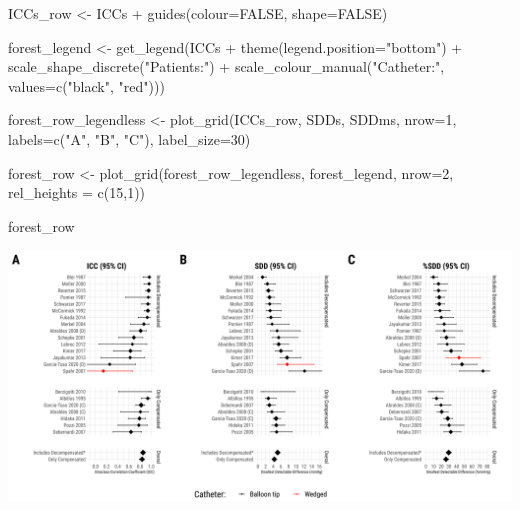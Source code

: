 \documentclass[
]{article}
\newenvironment{Shaded}{\begin{snugshade}}{\end{snugshade}}
\newcommand{\AttributeTok}[1]{\textcolor[rgb]{0.77,0.63,0.00}{#1}}
\newcommand{\ConstantTok}[1]{\textcolor[rgb]{0.00,0.00,0.00}{#1}}
\newcommand{\DecValTok}[1]{\textcolor[rgb]{0.00,0.00,0.81}{#1}}
\newcommand{\FunctionTok}[1]{\textcolor[rgb]{0.00,0.00,0.00}{#1}}
\newcommand{\NormalTok}[1]{#1}
\newcommand{\OtherTok}[1]{\textcolor[rgb]{0.56,0.35,0.01}{#1}}
\newcommand{\SpecialCharTok}[1]{\textcolor[rgb]{0.00,0.00,0.00}{#1}}
\newcommand{\StringTok}[1]{\textcolor[rgb]{0.31,0.60,0.02}{#1}}
\begin{document}
\begin{Shaded}
\begin{Highlighting}[]
\NormalTok{ICCs\_row }\OtherTok{\textless{}{-}}\NormalTok{ ICCs }\SpecialCharTok{+} \FunctionTok{guides}\NormalTok{(}\AttributeTok{colour=}\ConstantTok{FALSE}\NormalTok{, }\AttributeTok{shape=}\ConstantTok{FALSE}\NormalTok{)}

\NormalTok{forest\_legend }\OtherTok{\textless{}{-}} \FunctionTok{get\_legend}\NormalTok{(ICCs }\SpecialCharTok{+} 
                              \FunctionTok{theme}\NormalTok{(}\AttributeTok{legend.position=}\StringTok{"bottom"}\NormalTok{) }\SpecialCharTok{+}
                              \FunctionTok{scale\_shape\_discrete}\NormalTok{(}\StringTok{"Patients:"}\NormalTok{) }\SpecialCharTok{+}
                              \FunctionTok{scale\_colour\_manual}\NormalTok{(}\StringTok{"Catheter:"}\NormalTok{,}
                                \AttributeTok{values=}\FunctionTok{c}\NormalTok{(}\StringTok{"black"}\NormalTok{, }\StringTok{"red"}\NormalTok{)))}

\NormalTok{forest\_row\_legendless }\OtherTok{\textless{}{-}} \FunctionTok{plot\_grid}\NormalTok{(ICCs\_row, SDDs, SDDms,}
          \AttributeTok{nrow=}\DecValTok{1}\NormalTok{, }\AttributeTok{labels=}\FunctionTok{c}\NormalTok{(}\StringTok{"A"}\NormalTok{, }\StringTok{"B"}\NormalTok{, }\StringTok{"C"}\NormalTok{), }
          \AttributeTok{label\_size=}\DecValTok{30}\NormalTok{)}

\NormalTok{forest\_row }\OtherTok{\textless{}{-}} \FunctionTok{plot\_grid}\NormalTok{(forest\_row\_legendless, forest\_legend,}
                        \AttributeTok{nrow=}\DecValTok{2}\NormalTok{, }\AttributeTok{rel\_heights =} \FunctionTok{c}\NormalTok{(}\DecValTok{15}\NormalTok{,}\DecValTok{1}\NormalTok{))}

\NormalTok{forest\_row}
\end{Highlighting}
\end{Shaded}

\includegraphics{figures/all_forest_row-1.png}
\end{document}
